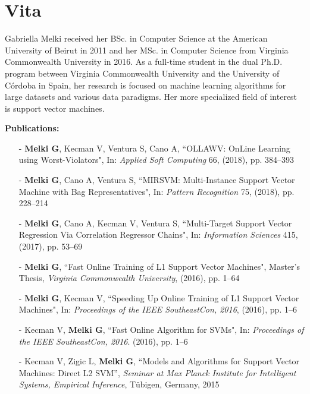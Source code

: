 \documentclass[reqno]{vcuthesis}
\numberwithin{equation}{chapter}
\begin{document}
\chapter*{Vita}
\thispagestyle{plain}
Gabriella Melki received her BSc. in Computer Science at the American University of Beirut in 2011 and her MSc. in Computer Science from Virginia Commonwealth University in 2016. As a full-time student in the dual Ph.D. program between Virginia Commonwealth University and the University of C\'{o}rdoba in Spain, her research is focused on machine learning algorithms for large datasets and various data paradigms. Her more specialized field of interest is support vector machines.

\textbf{Publications:}
\begin{itemize}
\item[-] \textbf{Melki G}, Kecman V, Ventura S, Cano A, ``OLLAWV: OnLine Learning using Worst-Violators", In: \textit{Applied Soft Computing} 66, (2018), pp. 384--393
\item[-] \textbf{Melki G}, Cano A, Ventura S, ``MIRSVM: Multi-Instance Support Vector Machine with Bag Representatives", In: \textit{Pattern Recognition} 75, (2018), pp. 228--214
\item[-] \textbf{Melki G}, Cano A, Kecman V, Ventura S, ``Multi-Target Support Vector Regression Via Correlation Regressor Chains", In: \textit{Information Sciences} 415, (2017), pp. 53--69
\item[-] \textbf{Melki G}, ``Fast Online Training of L1 Support Vector Machines", Master's Thesis, \textit{Virginia Commonwealth University}, (2016), pp. 1--64
\item[-] \textbf{Melki G}, Kecman V, ``Speeding Up Online Training of L1 Support Vector Machines", In: \textit{Proceedings of the IEEE SoutheastCon, 2016}, (2016), pp. 1--6
\item[-] Kecman V, \textbf{Melki G}, ``Fast Online Algorithm for SVMs", In: \textit{Proceedings of the IEEE SoutheastCon, 2016}. (2016), pp. 1--6
\item[-] Kecman V, Zigic L, \textbf{Melki G}, ``Models and Algorithms for Support Vector Machines: Direct L2 SVM'', \textit{Seminar at Max Planck Institute for Intelligent Systems, Empirical Inference}, T\"{u}bigen, Germany, 2015
\end{itemize}
\end{document}
